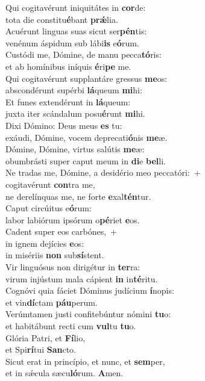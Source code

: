 \evenverse Qui cogitavérunt iniquitátes in \textbf{cor}de:~\*\\
\evenverse tota die constitu\textbf{é}bant \textbf{prǽ}lia.\\
\oddverse Acuérunt linguas suas sicut ser\textbf{pén}tis:~\*\\
\oddverse venénum áspidum sub lábi\textbf{is} e\textbf{ó}rum.\\
\evenverse Custódi me, Dómine, de manu pecca\textbf{tó}ris:~\*\\
\evenverse et ab homínibus iníquis \textbf{é}ri\textbf{pe} me.\\
\oddverse Qui cogitavérunt supplantáre gressus \textbf{me}os:~\*\\
\oddverse abscondérunt supérbi \textbf{lá}queum \textbf{mi}hi:\\
\evenverse Et funes extendérunt in \textbf{lá}queum:~\*\\
\evenverse juxta iter scándalum posu\textbf{é}runt \textbf{mi}hi.\\
\oddverse Dixi Dómino: Deus meus \textbf{es} tu:~\*\\
\oddverse exáudi, Dómine, vocem deprecati\textbf{ó}nis \textbf{me}æ.\\
\evenverse Dómine, Dómine, virtus salútis \textbf{me}æ:~\*\\
\evenverse obumbrásti super caput meum in \textbf{di}e \textbf{bel}li.\\
\oddverse Ne tradas me, Dómine, a desidério meo peccatóri:~+\\
\oddverse  cogitavérunt \textbf{con}tra me,~\*\\
\oddverse ne derelínquas me, ne forte \textbf{e}xal\textbf{tén}tur.\\
\evenverse Caput circúitus e\textbf{ó}rum:~\*\\
\evenverse labor labiórum ipsórum o\textbf{pé}riet \textbf{e}os.\\
\oddverse Cadent super eos carbónes,~+\\
\oddverse  in ignem dejícies \textbf{e}os:~\*\\
\oddverse in misériis \textbf{non} sub\textbf{sí}stent.\\
\evenverse Vir linguósus non dirigétur in \textbf{ter}ra:~\*\\
\evenverse virum injústum mala cápient \textbf{in} in\textbf{té}ritu.\\
\oddverse Cognóvi quia fáciet Dóminus judícium \textbf{í}nopis:~\*\\
\oddverse et vin\textbf{dí}ctam \textbf{páu}perum.\\
\evenverse Verúmtamen justi confitebúntur nómini \textbf{tu}o:~\*\\
\evenverse et habitábunt recti cum \textbf{vul}tu \textbf{tu}o.\\
\oddverse Glória Patri, et \textbf{Fí}lio,~\*\\
\oddverse et Spi\textbf{rí}tui \textbf{San}cto.\\
\evenverse Sicut erat in princípio, et nunc, et \textbf{sem}per,~\*\\
\evenverse et in sǽcula sæcu\textbf{ló}rum. \textbf{A}men.\\
